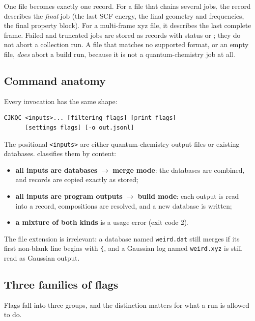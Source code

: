 One file becomes exactly one record. For a file that chains several jobs,
the record describes the \emph{final} job (the last SCF energy, the final
geometry and frequencies, the final property block). For a multi-frame xyz
file, it describes the last complete frame. Failed and truncated jobs are
stored as records with status  or ; they do not
abort a collection run. A file that matches no supported format, or an empty file,
\emph{does} abort a build run, because it is not a quantum-chemistry job at
all.

\subsection{Command anatomy}

Every invocation has the same shape:

\begin{verbatim}
CJKQC <inputs>... [filtering flags] [print flags]
      [settings flags] [-o out.jsonl]
\end{verbatim}

The positional \texttt{<inputs>} are either quantum-chemistry output files or
existing databases. \CJKQC{} classifies them by content:

\begin{itemize}
  \item \textbf{all inputs are databases} \(\rightarrow\) \textbf{merge mode}:
        the databases are combined, and records are copied exactly as stored;
  \item \textbf{all inputs are program outputs} \(\rightarrow\) \textbf{build mode}:
        each output is read into a record, compositions are resolved, and a
        new database is written;
  \item \textbf{a mixture of both kinds} is a usage error (exit code 2).
\end{itemize}

The file extension is irrelevant: a database named \texttt{weird.dat} still
merges if its first non-blank line begins with \texttt{\{}, and a Gaussian
log named \texttt{weird.xyz} is still read as Gaussian output.

\subsection{Three families of flags}

Flags fall into three groups, and the distinction matters for what a run is
allowed to do.

